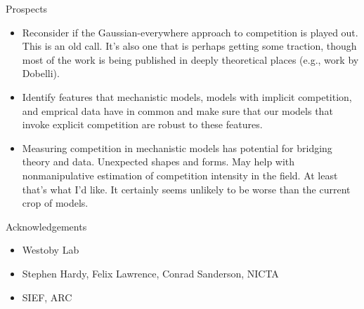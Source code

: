 \documentclass[12pt]{beamer}
\begin{document}
\begin{frame}{Prospects}
  \begin{itemize}
  \item Reconsider if the Gaussian-everywhere approach to competition
    is played out.  This is an old call.  It's also one that is
    perhaps getting some traction, though most of the work is being
    published in deeply theoretical places (e.g., work by Dobelli).
  \item Identify features that mechanistic models, models with
    implicit competition, and emprical data have in common and make
    sure that our models that invoke explicit competition are robust
    to these features.
  \item Measuring competition in mechanistic models has potential for
    bridging theory and data.  Unexpected shapes and forms.  May help
    with nonmanipulative estimation of competition intensity in the
    field.  At least that's what I'd like.  It certainly seems
    unlikely to be worse than the current crop of models.
  \end{itemize}
\end{frame}

\begin{frame}{Acknowledgements}
  \begin{itemize}
  \item Westoby Lab
  \item Stephen Hardy, Felix Lawrence, Conrad Sanderson, NICTA
  \item SIEF, ARC
  \end{itemize}
\end{frame}


    
\end{document}
